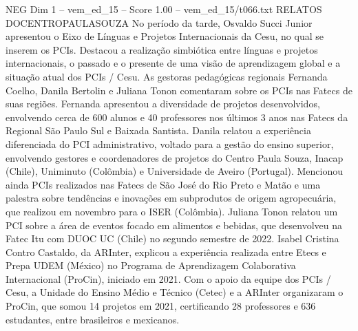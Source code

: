 \begin{textsample}{NEG Dim 1 – vem\_ed\_15 – Score 1.00 – vem\_ed\_15/t066.txt}  \label{ex:f1_neg_037}
RELATOS DOCENTROPAULASOUZA No período da tarde, Osvaldo Succi Junior apresentou o Eixo de Línguas e Projetos Internacionais da Cesu, no qual se inserem os PCIs.
Destacou a realização simbiótica entre línguas e projetos internacionais, o passado e o presente de uma visão de aprendizagem global e a situação atual dos PCIs / Cesu.
As gestoras pedagógicas regionais Fernanda Coelho, Danila Bertolin e Juliana Tonon comentaram sobre os PCIs nas Fatecs de suas regiões.
Fernanda apresentou a diversidade de projetos desenvolvidos, envolvendo cerca de 600 alunos e 40 professores nos últimos 3 anos nas Fatecs da Regional São Paulo Sul e Baixada Santista.
Danila relatou a experiência diferenciada do PCI administrativo, voltado para a gestão do ensino superior, envolvendo gestores e coordenadores de projetos do Centro Paula Souza, Inacap (Chile), Uniminuto (Colômbia) e Universidade de Aveiro (Portugal).
Mencionou ainda PCIs realizados nas Fatecs de São José do Rio Preto e Matão e uma palestra sobre tendências e inovações em subprodutos de origem agropecuária, que realizou em novembro para o ISER (Colômbia).
Juliana Tonon relatou um PCI sobre a área de eventos focado em alimentos e bebidas, que desenvolveu na Fatec Itu com DUOC UC (Chile) no segundo semestre de 2022.
Isabel Cristina Contro Castaldo, da ARInter, explicou a experiência realizada entre Etecs e Prepa UDEM (México) no Programa de Aprendizagem Colaborativa Internacional (ProCin), iniciado em 2021.
Com o apoio da equipe dos PCIs / Cesu, a Unidade do Ensino Médio e Técnico (Cetec) e a ARInter organizaram o ProCin, que somou 14 projetos em 2021, certificando 28 professores e 636 estudantes, entre brasileiros e mexicanos.

\end{textsample}

